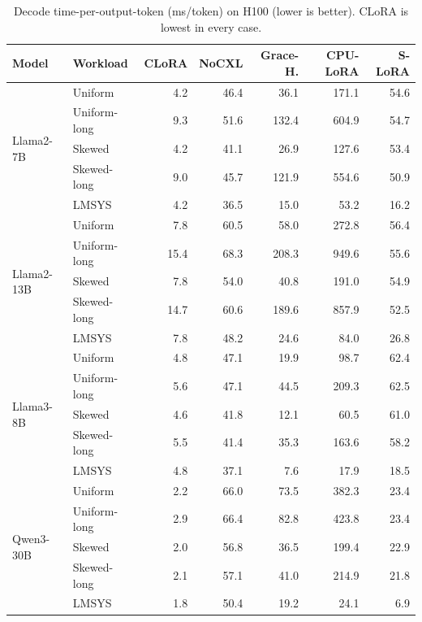 \begin{table}[t]\centering\small
\caption{Decode time-per-output-token (ms/token) on H100 (lower is better). CLoRA is lowest in every case.}
\label{tab:tpot}
\begin{tabular}{llrrrrr}
\toprule
Model & Workload & CLoRA & NoCXL & Grace-H. & CPU-LoRA & S-LoRA \\
\midrule
\multirow{5}{*}{Llama2-7B} & Uniform & 4.2 & 46.4 & 36.1 & 171.1 & 54.6 \\
 & Uniform-long & 9.3 & 51.6 & 132.4 & 604.9 & 54.7 \\
 & Skewed & 4.2 & 41.1 & 26.9 & 127.6 & 53.4 \\
 & Skewed-long & 9.0 & 45.7 & 121.9 & 554.6 & 50.9 \\
 & LMSYS & 4.2 & 36.5 & 15.0 & 53.2 & 16.2 \\
\midrule
\multirow{5}{*}{Llama2-13B} & Uniform & 7.8 & 60.5 & 58.0 & 272.8 & 56.4 \\
 & Uniform-long & 15.4 & 68.3 & 208.3 & 949.6 & 55.6 \\
 & Skewed & 7.8 & 54.0 & 40.8 & 191.0 & 54.9 \\
 & Skewed-long & 14.7 & 60.6 & 189.6 & 857.9 & 52.5 \\
 & LMSYS & 7.8 & 48.2 & 24.6 & 84.0 & 26.8 \\
\midrule
\multirow{5}{*}{Llama3-8B} & Uniform & 4.8 & 47.1 & 19.9 & 98.7 & 62.4 \\
 & Uniform-long & 5.6 & 47.1 & 44.5 & 209.3 & 62.5 \\
 & Skewed & 4.6 & 41.8 & 12.1 & 60.5 & 61.0 \\
 & Skewed-long & 5.5 & 41.4 & 35.3 & 163.6 & 58.2 \\
 & LMSYS & 4.8 & 37.1 & 7.6 & 17.9 & 18.5 \\
\midrule
\multirow{5}{*}{Qwen3-30B} & Uniform & 2.2 & 66.0 & 73.5 & 382.3 & 23.4 \\
 & Uniform-long & 2.9 & 66.4 & 82.8 & 423.8 & 23.4 \\
 & Skewed & 2.0 & 56.8 & 36.5 & 199.4 & 22.9 \\
 & Skewed-long & 2.1 & 57.1 & 41.0 & 214.9 & 21.8 \\
 & LMSYS & 1.8 & 50.4 & 19.2 & 24.1 & 6.9 \\
\bottomrule
\end{tabular}
\end{table}
